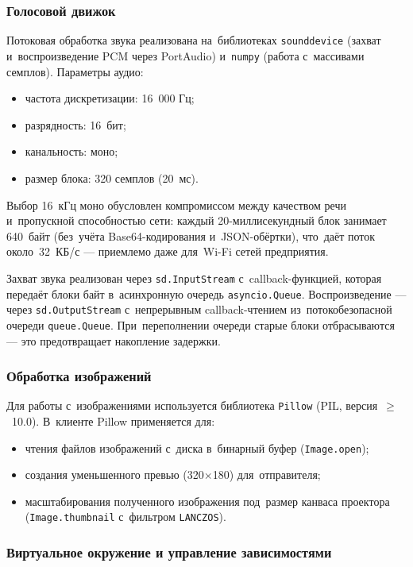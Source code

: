 \subsubsection{Голосовой движок}

Потоковая обработка звука реализована на~библиотеках \texttt{sounddevice} (захват и~воспроизведение PCM через PortAudio) и~\texttt{numpy} (работа с~массивами семплов). Параметры аудио:

\begin{itemize}
  \item частота дискретизации: 16~000 Гц;
  \item разрядность: 16~бит;
  \item канальность: моно;
  \item размер блока: 320 семплов (20~мс).
\end{itemize}

Выбор 16~кГц моно обусловлен компромиссом между качеством речи и~пропускной способностью сети: каждый 20-миллисекундный блок занимает 640~байт (без~учёта Base64-кодирования и~JSON-обёртки), что~даёт поток около~32~КБ/с — приемлемо даже для~Wi-Fi сетей предприятия.

Захват звука реализован через \texttt{sd.InputStream} с~callback-функцией, которая передаёт блоки байт в~асинхронную очередь \texttt{asyncio.Queue}. Воспроизведение --- через \texttt{sd.OutputStream} с~непрерывным callback-чтением из~потокобезопасной очереди \texttt{queue.Queue}. При~переполнении очереди старые блоки отбрасываются --- это предотвращает накопление задержки.

\subsubsection{Обработка изображений}

Для работы с~изображениями используется библиотека \texttt{Pillow} (PIL, версия~$\ge$~10.0). В~клиенте Pillow применяется для:

\begin{itemize}
  \item чтения файлов изображений с~диска в~бинарный буфер (\texttt{Image.open});
  \item создания уменьшенного превью (320$\times$180) для~отправителя;
  \item масштабирования полученного изображения под~размер канваса проектора (\texttt{Image.thumbnail} с~фильтром \texttt{LANCZOS}).
\end{itemize}

\subsubsection{Виртуальное окружение и управление зависимостями}

